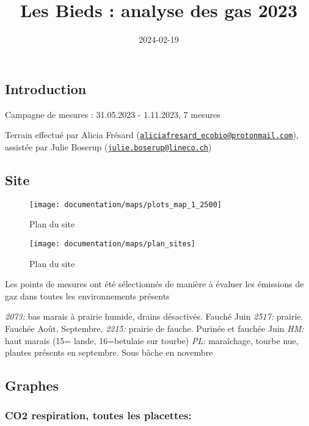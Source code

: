 \documentclass[
]{article}
\title{Les Bieds : analyse des gas 2023}
\author{}
\date{\vspace{-2.5em}2024-02-19}
\begin{document}
\maketitle

\hypertarget{introduction}{%
\subsection{Introduction}\label{introduction}}

Campagne de mesures : 31.05.2023 - 1.11.2023, 7 mesures

Terrain effectué par Alicia Frésard
(\href{mailto:aliciafresard_ecobio@protonmail.com}{\nolinkurl{aliciafresard\_ecobio@protonmail.com}}),
assistée par Julie Boserup
(\href{mailto:julie.boserup@lineco.ch}{\nolinkurl{julie.boserup@lineco.ch}})

\hypertarget{site}{%
\subsection{Site}\label{site}}

\begin{figure}
\texttt{[image: documentation/maps/plots\_map\_1\_2500]} \caption{Plan du site}\label{fig:site-1}
\end{figure}
\begin{figure}
\texttt{[image: documentation/maps/plan\_sites]} \caption{Plan du site}\label{fig:site-2}
\end{figure}

Les points de mesures ont été sélectionnés de manière à évaluer les
émissions de gaz dans toutes les environnements présents

\emph{2073:} bas marais à prairie humide, drains désactivés. Fauché Juin
\emph{2517:} prairie. Fauchée Août, Septembre, \emph{2215:} prairie de
fauche. Purinée et fauchée Juin \emph{HM:} haut marais (15= lande,
16=betulaie sur tourbe) \emph{PL:} maraîchage, tourbe nue, plantes
présents en septembre. Sous bâche en novembre

\hypertarget{graphes}{%
\subsection{Graphes}\label{graphes}}

\hypertarget{co2-respiration-toutes-les-placettes}{%
\subsubsection{CO2 respiration, toutes les
placettes:}\label{co2-respiration-toutes-les-placettes}}
\end{document}

